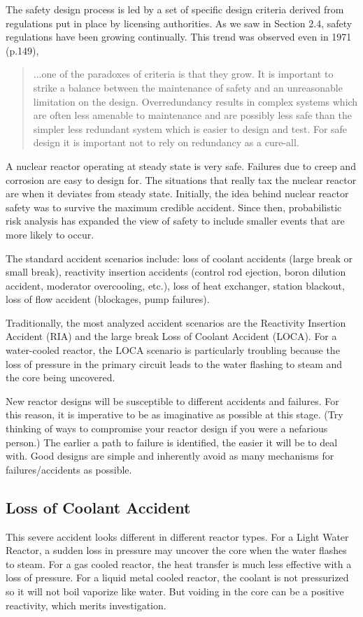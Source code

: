 The safety design process is led by a set of specific design criteria derived from regulations put in place by licensing authorities. As we saw in Section 2.4, %
safety regulations have been growing continually. This trend was observed even in 1971 \cite{Graham} (p.149),
\begin{quote}
  ...one of the paradoxes of criteria is that they grow. It is important to strike a balance between the maintenance of safety and an unreasonable limitation on the design. Overredundancy results in complex systems which are often less amenable to maintenance and are possibly less safe than the simpler less redundant system which is easier to design and test. For safe design it is important not to rely on redundancy as a cure-all.
\end{quote}

A nuclear reactor operating at steady state is very safe. Failures due to creep and corrosion are easy to design for.
The situations that really tax the nuclear reactor are when it deviates from steady state.
Initially, the idea behind nuclear reactor safety was to survive the maximum credible accident.
Since then, probabilistic risk analysis has expanded the view of safety to include smaller events that are more likely to occur. %

The standard accident scenarios include: loss of coolant accidents (large break or small break), reactivity insertion accidents (control rod ejection, boron dilution accident, moderator overcooling, etc.), loss of heat exchanger, station blackout, loss of flow accident (blockages, pump failures).

Traditionally, the most analyzed accident scenarios are the Reactivity Insertion Accident (RIA) and the large break Loss of Coolant Accident (LOCA). 
For a water-cooled reactor, the LOCA scenario is particularly troubling because the loss of pressure in the primary circuit leads to the water flashing to steam and the core being uncovered.

New reactor designs will be susceptible to different accidents and failures. For this reason, it is imperative to be as imaginative as possible at this stage.
(Try thinking of ways to compromise your reactor design if you were a nefarious person.)
The earlier a path to failure is identified, the easier it will be to deal with.
Good designs are simple and inherently avoid as many mechanisms for failures/accidents as possible.

\subsection{Loss of Coolant Accident}
This severe accident looks different in different reactor types. For a Light Water Reactor, a sudden loss in pressure may uncover the core when the water flashes to steam.
For a gas cooled reactor, the heat transfer is much less effective with a loss of pressure.
For a liquid metal cooled reactor, the coolant is not pressurized so it will not boil vaporize like water. But voiding in the core can be a positive reactivity, which merits investigation.

